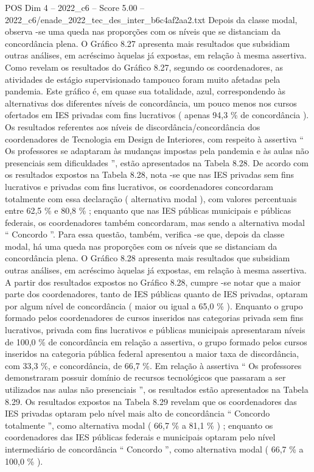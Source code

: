 \begin{textsample}{POS Dim 4 – 2022\_c6 – Score 5.00 – 2022\_c6/enade\_2022\_tec\_des\_inter\_b6c4af2aa2.txt}
Depois da classe modal, observa -se uma queda nas proporções com os níveis que se distanciam da concordância plena.
O Gráfico 8.27 apresenta mais resultados que subsidiam outras análises, em acréscimo àquelas já expostas, em relação à mesma assertiva.
Como revelam os resultados do Gráfico 8.27, segundo os coordenadores, as atividades de estágio supervisionado tampouco foram muito afetadas pela pandemia.
Este gráfico é, em quase sua totalidade, azul, correspondendo às alternativas dos diferentes níveis de concordância, um pouco menos nos cursos ofertados em IES privadas com fins lucrativos ( apenas 94,3 \% de concordância ).
Os resultados referentes aos níveis de discordância/concordância dos coordenadores de Tecnologia em Design de Interiores, com respeito à assertiva “ Os professores se adaptaram às mudanças impostas pela pandemia e às aulas não presenciais sem dificuldades ”, estão apresentados na Tabela 8.28.
De acordo com os resultados expostos na Tabela 8.28, nota -se que nas IES privadas sem fins lucrativos e privadas com fins lucrativos, os coordenadores concordaram totalmente com essa declaração ( alternativa modal ), com valores percentuais entre 62,5 \% e 80,8 \% ; enquanto que nas IES públicas municipais e públicas federais, os coordenadores também concordaram, mas sendo a alternativa modal “ Concordo ”.
Para essa questão, também, verifica -se que, depois da classe modal, há uma queda nas proporções com os níveis que se distanciam da concordância plena.
O Gráfico 8.28 apresenta mais resultados que subsidiam outras análises, em acréscimo àquelas já expostas, em relação à mesma assertiva.
A partir dos resultados expostos no Gráfico 8.28, cumpre -se notar que a maior parte dos coordenadores, tanto de IES públicas quanto de IES privadas, optaram por algum nível de concordância ( maior ou igual a 65,0 \% ).
Enquanto o grupo formado pelos coordenadores de cursos inseridos nas categorias privada sem fins lucrativos, privada com fins lucrativos e públicas municipais apresentaram níveis de 100,0 \% de concordância em relação a assertiva, o grupo formado pelos cursos inseridos na categoria pública federal apresentou a maior taxa de discordância, com 33,3 \%, e concordância, de 66,7 \%.
Em relação à assertiva “ Os professores demonstraram possuir domínio de recursos tecnológicos que passaram a ser utilizados nas aulas não presenciais ”, os resultados estão apresentados na Tabela 8.29.
Os resultados expostos na Tabela 8.29 revelam que os coordenadores das IES privadas optaram pelo nível mais alto de concordância “ Concordo totalmente ”, como alternativa modal ( 66,7 \% a 81,1 \% ) ; enquanto os coordenadores das IES públicas federais e municipais optaram pelo nível intermediário de concordância “ Concordo ”, como alternativa modal ( 66,7 \% a 100,0 \% ).

\end{textsample}
